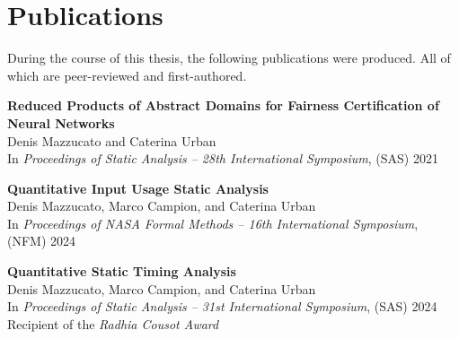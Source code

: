 \def\mazzucatoa{}\def\mazzucatob{}\def\mazzucatoc{}


\newcommand\tab[1][1em]{\hspace*{#1}}

\chapter*{Publications}


During the course of this thesis, the following publications were produced. All of which are peer-reviewed and first-authored.


\vspace{3em}


\textbf{Reduced Products of Abstract Domains for Fairness Certification of Neural Networks}\\
\tab Denis Mazzucato and Caterina Urban \\
\tab In \emph{Proceedings of Static Analysis -- 28th International Symposium}, (SAS) 2021

\vspace{1.5em}

\textbf{Quantitative Input Usage Static Analysis}\\
\tab Denis Mazzucato, Marco Campion, and Caterina Urban \\
\tab In \emph{Proceedings of {NASA} Formal Methods -- 16th International Symposium}, (NFM) 2024

\vspace{1.5em}

\textbf{Quantitative Static Timing Analysis}\\
\tab Denis Mazzucato, Marco Campion, and Caterina Urban \\
\tab In \emph{Proceedings of Static Analysis -- 31st International Symposium}, (SAS) 2024\\
\tab\tab Recipient of the \emph{Radhia Cousot Award}
